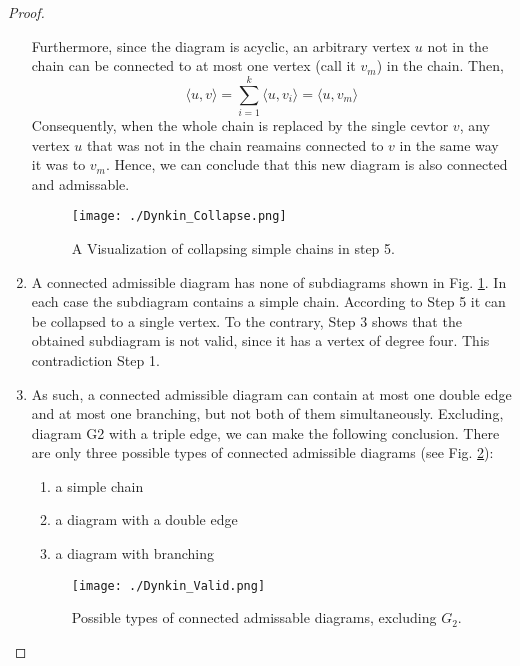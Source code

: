 \begin{proof}
\begin{enumerate}
        Furthermore, since the diagram is acyclic, an arbitrary vertex $u$ not in the chain can be connected  to at most one vertex 
        (call it $v_m$) in the chain. Then,
            \begin{equation*}
                \langle u, v \rangle = \sum_{i=1}^{k} \langle u, v_i\rangle = \langle u, v_m \rangle
            \end{equation*}
        Consequently, when the whole chain is replaced by the single cevtor $v$, any vertex $u$ that was not in the chain reamains connected
        to $v$ in the same way it was to $v_m$. Hence, we can conclude that this new diagram is also connected and admissable.
        
        \begin{figure}
            \centering
            \texttt{[image: ./Dynkin\_Collapse.png]}
            \label{img:collapse}
            \caption{A Visualization of collapsing simple chains in step 5.}
        \end{figure}
    
        \item A connected admissible diagram has none of subdiagrams shown in Fig. \ref{img:collapse}.
        In each case the subdiagram contains a simple chain.
        According to Step 5 it can be collapsed to a single vertex. To the contrary, Step 3 shows that the obtained subdiagram is not
        valid, since it has a vertex of degree four. This contradiction Step 1.

        \item As such, a connected admissible diagram can contain at most one double edge and at most one branching, but not both
        of them simultaneously. Excluding, diagram G2 with a triple edge, we can make the following conclusion.
        There are only three possible types of connected admissible diagrams (see Fig. \ref{img:valid}):
        
        \begin{enumerate}[start=1,label={\bfseries T\arabic*:}]
            \item a simple chain
            \item a diagram with a double edge
            \item a diagram with branching
        \end{enumerate}
    
        \begin{figure}[h]
            \centering
            \texttt{[image: ./Dynkin\_Valid.png]}
            \caption{Possible types of connected admissable diagrams, excluding $G_2$.}
            \label{img:valid}
        \end{figure}


\end{enumerate}
\end{proof}
